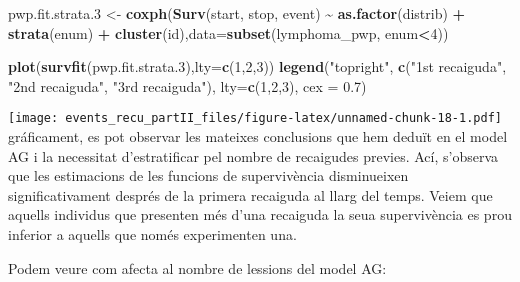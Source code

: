 \documentclass[
]{article}
\newenvironment{Shaded}{\begin{snugshade}}{\end{snugshade}}
\newcommand{\AttributeTok}[1]{\textcolor[rgb]{0.13,0.29,0.53}{#1}}
\newcommand{\DecValTok}[1]{\textcolor[rgb]{0.00,0.00,0.81}{#1}}
\newcommand{\FloatTok}[1]{\textcolor[rgb]{0.00,0.00,0.81}{#1}}
\newcommand{\FunctionTok}[1]{\textcolor[rgb]{0.13,0.29,0.53}{\textbf{#1}}}
\newcommand{\NormalTok}[1]{#1}
\newcommand{\OtherTok}[1]{\textcolor[rgb]{0.56,0.35,0.01}{#1}}
\newcommand{\SpecialCharTok}[1]{\textcolor[rgb]{0.81,0.36,0.00}{\textbf{#1}}}
\newcommand{\StringTok}[1]{\textcolor[rgb]{0.31,0.60,0.02}{#1}}
\begin{document}
\begin{Shaded}
\begin{Highlighting}[]
\NormalTok{pwp.fit.strata}\FloatTok{.3} \OtherTok{\textless{}{-}} \FunctionTok{coxph}\NormalTok{(}\FunctionTok{Surv}\NormalTok{(start, stop, event) }\SpecialCharTok{\textasciitilde{}} \FunctionTok{as.factor}\NormalTok{(distrib) }\SpecialCharTok{+} \FunctionTok{strata}\NormalTok{(enum) }\SpecialCharTok{+} \FunctionTok{cluster}\NormalTok{(id),}\AttributeTok{data=}\FunctionTok{subset}\NormalTok{(lymphoma\_pwp, enum}\SpecialCharTok{\textless{}}\DecValTok{4}\NormalTok{))}

\FunctionTok{plot}\NormalTok{(}\FunctionTok{survfit}\NormalTok{(pwp.fit.strata}\FloatTok{.3}\NormalTok{),}\AttributeTok{lty=}\FunctionTok{c}\NormalTok{(}\DecValTok{1}\NormalTok{,}\DecValTok{2}\NormalTok{,}\DecValTok{3}\NormalTok{))}
\FunctionTok{legend}\NormalTok{(}\StringTok{"topright"}\NormalTok{, }\FunctionTok{c}\NormalTok{(}\StringTok{"1st recaiguda"}\NormalTok{, }\StringTok{"2nd recaiguda"}\NormalTok{, }\StringTok{"3rd recaiguda"}\NormalTok{), }\AttributeTok{lty=}\FunctionTok{c}\NormalTok{(}\DecValTok{1}\NormalTok{,}\DecValTok{2}\NormalTok{,}\DecValTok{3}\NormalTok{), }\AttributeTok{cex =} \FloatTok{0.7}\NormalTok{)}
\end{Highlighting}
\end{Shaded}

\texttt{[image: events\_recu\_partII\_files/figure-latex/unnamed-chunk-18-1.pdf]}
gráficament, es pot observar les mateixes conclusions que hem deduït en
el model AG i la necessitat d'estratificar pel nombre de recaigudes
previes. Ací, s'observa que les estimacions de les funcions de
supervivència disminueixen significativament després de la primera
recaiguda al llarg del temps. Veiem que aquells individus que presenten
més d'una recaiguda la seua supervivència es prou inferior a aquells que
només experimenten una.

Podem veure com afecta al nombre de lessions del model AG:
\end{document}
